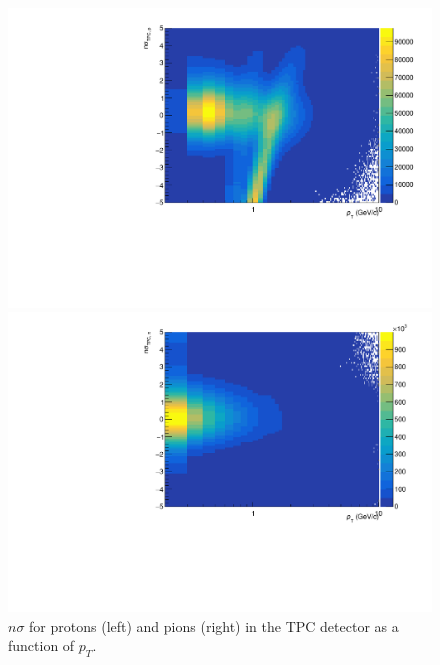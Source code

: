 \begin{figure}[h]
	\centering
	\begin{minipage}{0.48\textwidth}
		\includegraphics[width=\textwidth]{figures/analysis/nsigma_tpc_proton.pdf}
	\end{minipage}
	\begin{minipage}{0.48\textwidth}
		\includegraphics[width=\textwidth]{figures/analysis/nsigma_tpc_pion.pdf}
	\end{minipage}
    \caption{$n\sigma$ for protons (left) and pions (right) in the TPC detector as a function of $p_{T}$.}
	\label{fig:nsigma_tpc}
\end{figure}

